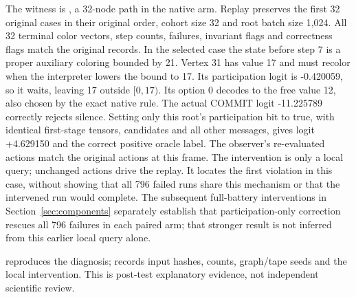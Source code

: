 The witness is , a 32-node path in the native arm.
Replay preserves the first 32 original cases in their original order,
cohort size 32 and root batch size 1,024. All 32 terminal color vectors,
step counts, failures, invariant flags and correctness flags match the
original records. In the selected case the state before step 7 is a
proper auxiliary coloring bounded by 21. Vertex 31 has value 17
and must recolor when the interpreter lowers the bound to 17.
Its participation logit is -0.420059, so it waits, leaving 17 outside
$[0,17)$. Its option 0 decodes to the free value 12,
also chosen by the exact native rule. The actual COMMIT logit -11.225789
correctly rejects silence. Setting only this root's participation bit to
true, with identical first-stage tensors, candidates and all other messages,
gives logit +4.629150 and the correct positive oracle label. The
observer's re-evaluated actions match the original actions at this frame.
The intervention is only a local query; unchanged actions drive the replay.
It locates the first violation in this case, without showing that all 796
failed runs share this mechanism or that the intervened run would complete.
The subsequent full-battery interventions in Section~\ref{sec:components}
separately establish that participation-only correction rescues all 796
failures in each paired arm; that stronger result is not inferred from
this earlier local query alone.

 reproduces the diagnosis;
 records
input hashes, counts, graph/tape seeds and the local intervention. This is
post-test explanatory evidence, not independent scientific review.
